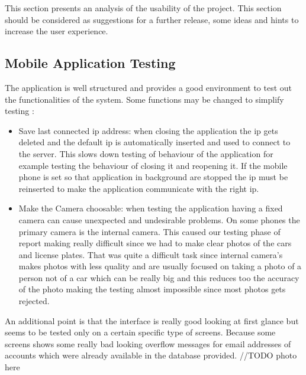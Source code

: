 This section presents an analysis of the usability of the project. This section should be considered as suggestions for a further release, some ideas and hints to increase the user experience.
\subsection{Mobile Application Testing}
The application is well structured and provides a good environment to test out the functionalities of the system.
Some functions may be changed to simplify testing :
\begin{itemize}
\item Save last connected ip address: when closing the application the ip gets deleted and the default ip is automatically inserted and used to connect to the server. This slows down testing of behaviour of the application for example testing the behaviour of closing it and reopening it. If the mobile phone is set so that application in background are stopped the ip must be reinserted to make the application communicate with the right ip.
\item Make the Camera choosable: when testing the application having a fixed camera can cause unexpected and undesirable problems. On some phones the primary camera is the internal camera. This caused our testing phase of report making really difficult since we had to make clear photos of the cars and license plates. That was quite a difficult task since internal camera's makes photos with less quality and are usually focused on taking a photo of a person not of a car which can be really big and this reduces too the accuracy of the photo making the testing almost impossible since most photos gets rejected.
\end{itemize}
An additional point is that the interface is really good looking at first glance but seems to be tested only on a certain specific type of screens. Because some screens shows some really bad looking overflow messages for email addresses of accounts which were already available in the database provided.
//TODO photo here

